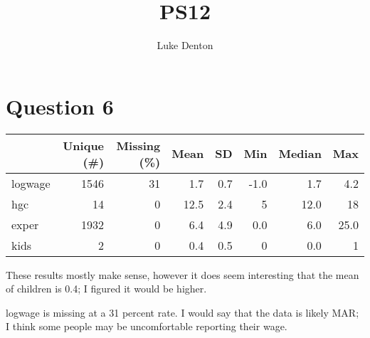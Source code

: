 \documentclass{homework}
\title{PS12}
\author{Luke Denton}
\begin{document}
\maketitle

\section{Question 6}

\begin{table}[h]
\centering
\begin{tabular}[t]{lrrrrrrr}
\toprule
  & Unique (\#) & Missing (\%) & Mean & SD & Min & Median & Max\\
\midrule
logwage & 1546 & 31 & 1.7 & 0.7 & -1.0 & 1.7 & 4.2\\
hgc & 14 & 0 & 12.5 & 2.4 & 5 & 12.0 & 18\\
exper & 1932 & 0 & 6.4 & 4.9 & 0.0 & 6.0 & 25.0\\
kids & 2 & 0 & 0.4 & 0.5 & 0 & 0.0 & 1\\
\bottomrule
\end{tabular}
\end{table}
These results mostly make sense, however it does seem interesting that the mean of children is 0.4; I figured it would be higher.

logwage is missing at a 31 percent rate. I would say that the data is likely MAR; I think some people may be uncomfortable reporting their wage.

\pagebreak
\end{document}
